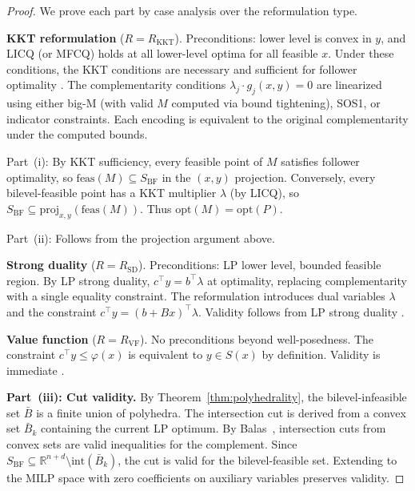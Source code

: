 \documentclass[11pt]{article}
\newcommand{\R}{\mathbb{R}}
\newcommand{\opt}{\mathrm{opt}}
\begin{document}
\begin{proof}
We prove each part by case analysis over the reformulation type.

\textbf{KKT reformulation} ($R = R_{\text{KKT}}$).
Preconditions: lower level is convex in $y$, and LICQ (or MFCQ) holds
at all lower-level optima for all feasible $x$. Under these conditions,
the KKT conditions are necessary and sufficient for follower optimality
\cite{dempe2002foundations}. The complementarity conditions
$\lambda_j \cdot g_j(x,y) = 0$ are linearized using either big-M
(with valid $M$ computed via bound tightening), SOS1, or indicator
constraints. Each encoding is equivalent to the original complementarity
under the computed bounds.

Part~(i): By KKT sufficiency, every feasible point of $M$ satisfies
follower optimality, so $\text{feas}(M) \subseteq S_{\text{BF}}$ in the
$(x,y)$ projection. Conversely, every bilevel-feasible point has a KKT
multiplier $\lambda$ (by LICQ), so $S_{\text{BF}} \subseteq \text{proj}_{x,y}(\text{feas}(M))$.
Thus $\opt(M) = \opt(P)$.

Part~(ii): Follows from the projection argument above.

\textbf{Strong duality} ($R = R_{\text{SD}}$).
Preconditions: LP lower level, bounded feasible region. By LP strong
duality, $c^\top y = b^\top \lambda$ at optimality, replacing
complementarity with a single equality constraint. The reformulation
introduces dual variables $\lambda$ and the constraint
$c^\top y = (b + Bx)^\top \lambda$. Validity follows from LP strong
duality \cite{fortuny1981representation}.

\textbf{Value function} ($R = R_{\text{VF}}$).
No preconditions beyond well-posedness. The constraint $c^\top y \leq \varphi(x)$
is equivalent to $y \in S(x)$ by definition. Validity is immediate
\cite{outrata1998nonsmooth}.

\textbf{Part~(iii): Cut validity.}
By Theorem~\ref{thm:polyhedrality}, the bilevel-infeasible set $\bar{B}$
is a finite union of polyhedra. The intersection cut is derived from a
convex set $\bar{B}_k$ containing the current LP optimum. By
Balas~\cite{balas1971intersection}, intersection cuts from convex
sets are valid inequalities for the complement. Since
$S_{\text{BF}} \subseteq \R^{n+d} \setminus \text{int}(\bar{B}_k)$,
the cut is valid for the bilevel-feasible set. Extending to the MILP
space with zero coefficients on auxiliary variables preserves validity.
\end{proof}
\end{document}
